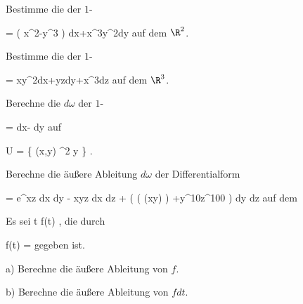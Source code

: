 \setcounter{section}{20}


{}
{

Bestimme die
der
$1$-

\mavergleichskettedisp
{\vergleichskette
{ \omega
}
{ =} { \left(  x^2-y^3  \right) dx+x^3y^2dy
}
{ } {
}
{ } {
}
{ } {
}
}
{}{}{}
auf dem $\R^2$.

}
{} {}

{}
{

Bestimme die
der
$1$-

\mavergleichskettedisp
{\vergleichskette
{ \omega
}
{ =} { xy^2dx+yzdy+x^3dz
}
{ } {
}
{ } {
}
{ } {
}
}
{}{}{}
auf dem $\R^3$.

}
{} {}

{}
{

Berechne die
$d \omega$ der
$1$-

\mavergleichskettedisp
{\vergleichskette
{ \omega
}
{ =} { {  } dx- {  } dy
}
{ } {
}
{ } {
}
{ } {
}
}
{}{}{}
auf

\mavergleichskette
{\vergleichskette
{ U
}
{ = }{ \left\{ (x,y) \in \R^2  \mid   y          \right\}
}
{  }{
}
{    }{
}
{   }{
}
}
{}{}{.}

}
{} {}

{}
{

Berechne die äußere Ableitung $d \omega$ der Differentialform

\mavergleichskettedisp
{\vergleichskette
{ \omega
}
{ =} {  e^{xz} dx \wedge dy - xyz dx \wedge dz + \left(  \sin ( \cos (xy) )  +y^{10}z^{100}  \right) dy \wedge dz
}
{ } {
}
{ } {
}
{ } {
}
}
{}{}{}
auf dem

}
{} {}

{}
{

Es sei
 {\R} {\R
} { t } {f(t)
} {,}
die durch

\mavergleichskettedisp
{\vergleichskette
{ f(t)
}
{ =} { {  }
}
{ } {
}
{ } {
}
{ } {
}
}
{}{}{}
gegeben ist.

a) Berechne die äußere Ableitung von $f$.

b) Berechne die äußere Ableitung von $fdt$.

}
{} {}

